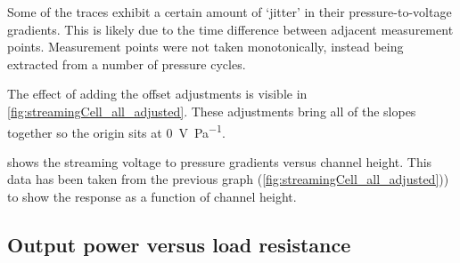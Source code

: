     Some of the traces exhibit a certain amount of `jitter' in their pressure-to-voltage gradients.
    This is likely due to the time difference between adjacent measurement points.
    Measurement points were not taken monotonically, instead being extracted from a number of pressure cycles.

    The effect of adding the offset adjustments is visible in \cref{fig:streamingCell_all_adjusted}.
    These adjustments bring all of the slopes together so the origin sits at \SI{0}{\volt\per\pascal}.

     shows the streaming voltage to pressure gradients versus channel height.
    This data has been taken from the previous graph (\cref{fig:streamingCell_all_adjusted})) to show the response as a function of channel height.


  \subsection{Output power versus load resistance}



